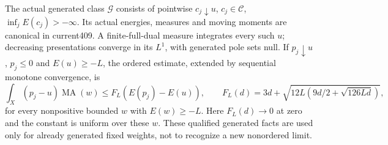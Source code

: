 \documentclass[11pt]{article}
\newcommand{\C}{\mathcal C}
\newcommand{\G}{\mathcal G}
\newcommand{\MA}{\operatorname{MA}}
\begin{document}
The actual generated class $\G$ consists of pointwise
$c_j\downarrow u$, $c_j\in\C$, $\inf_jE(c_j)>-\infty$.
Its actual energies, measures and moving moments are canonical in
current409. A finite-full-dual measure integrates every such $u$;
decreasing presentations converge in its $L^1$, with generated
pole sets null. If $p_j\downarrow u$, $p_j\le0$ and
$E(u)\ge-L$, the ordered estimate, extended by sequential
monotone convergence, is
\begin{equation}\label{ordered}
 \int_X(p_j-u)\MA(w)\le F_L(E(p_j)-E(u)),\qquad
 F_L(d)=3d+\sqrt{12L(9d/2+\sqrt{126Ld})},
\end{equation}
for every nonpositive bounded $w$ with $E(w)\ge-L$.
Here $F_L(d)\to0$ at zero and the constant is uniform over these
$w$. These qualified generated facts are used only for already
generated fixed weights, not to recognize a new nonordered limit.
\end{document}
